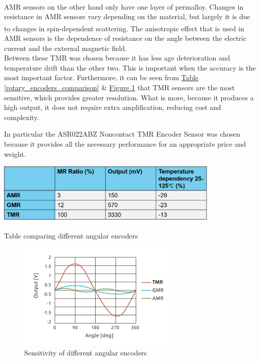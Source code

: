 \documentclass[11pt]{article}		%
\newlength{\imageheight}	 %
\newcommand{\supercite}[1]{\textsuperscript{\cite{#1}}}		%
\newcommand{\figref}[1]{\hyperref[#1]{Figure \ref*{#1}}}    %
\newcommand{\tableref}[1]{\hyperref[#1]{Table \ref*{#1}}}     %
\begin{document}
            \\
            AMR sensors on the other hand only have one layer of permalloy. 
            Changes in resistance in AMR sensors vary depending on the material, but largely it is due to changes in spin-dependent scattering.\supercite{explanation_magntoresistance2}
            The anisotropic effect that is used in AMR sensors is the dependence of resistance on the angle between the electric current and the external magnetic field.
            \\
            Between these TMR was chosen because it has less age deterioration and temperature drift than the other two.
            This is important when the accuracy is the most important factor. 
            Furthermore, it can be seen from \tableref{rotary_encoders_comparison} \& \figref{rotary_encoders_graph} that TMR sensors are the most sensitive, which provides greater resolution. What is more, because it produces a high output, it does not require extra amplification, reducing cost and complexity. 
            
            In particular the ASR022ABZ Noncontact TMR Encoder Sensor was chosen because it provides all the necessary performance for an appropriate price and weight.
            
            \begin{table}[h]
					\centering
						\includegraphics[width=0.8\textwidth] {AMR_comparison table_formatted}
						\caption{Table comparing different angular encoders}
						\label{rotary_encoders_comparison}
				\end{table}
				
			    \begin{figure}[h]
					\centering
					\includegraphics[height=\imageheight] {Graph_of_different_rotary_encoders}
					\caption{Sensitivity of different angular encoders \cite{TMR_graph}}
					\label{rotary_encoders_graph}
				\end{figure}
            
\end{document}
